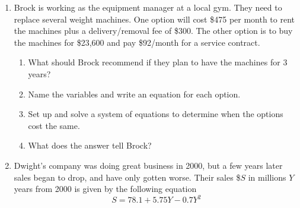 \begin{enumerate}

\newpage

\item Brock is working as the equipment manager at a local gym.  They need to replace several weight machines.  One option will cost \$475 per month to rent the machines plus a delivery/removal fee of \$300.  The other option is to buy the machines for \$23,600 and pay \$92/month for a service contract.
\begin{enumerate}
\item What should Brock recommend if they plan to have the machines for 3 years? \vfill
\item Name the variables and write an equation for each option. \vfill \vfill
\item Set up and solve a system of equations to determine when the options cost the same. \vfill \vfill \vfill
\item What does the answer tell Brock?\vfill
\end{enumerate}  

\newpage

\item Dwight's company was doing great business in 2000, but a few years later sales began to drop, and have only gotten worse.  Their sales \$$S$ in millions $Y$ years from 2000 is given by the following equation $$S = 78.1+5.75Y-0.7Y^2$$


\end{enumerate}
